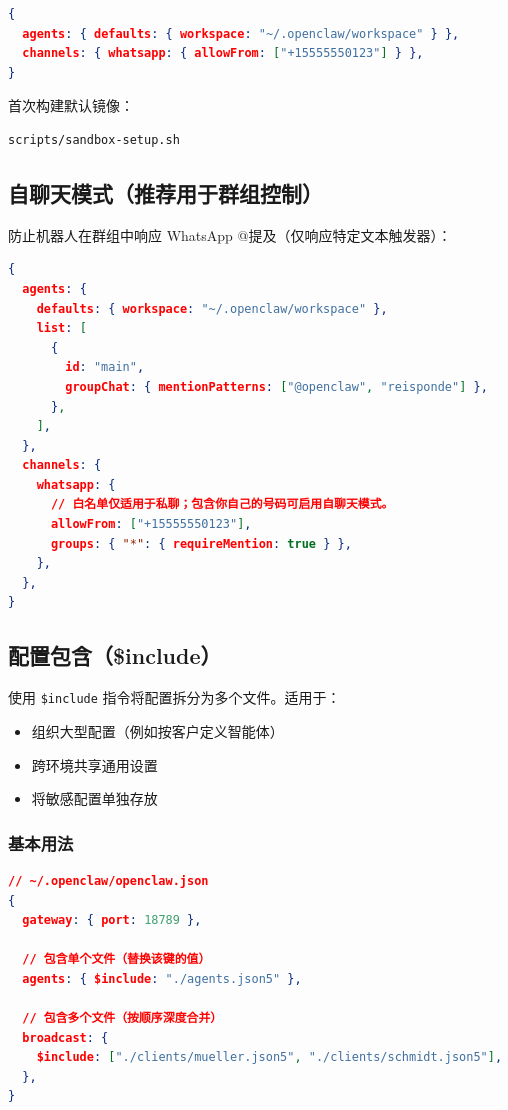 \begin{lstlisting}[language=json]
{
  agents: { defaults: { workspace: "~/.openclaw/workspace" } },
  channels: { whatsapp: { allowFrom: ["+15555550123"] } },
}
\end{lstlisting}


首次构建默认镜像：

\begin{lstlisting}[language=bash]
scripts/sandbox-setup.sh
\end{lstlisting}


\subsection{自聊天模式（推荐用于群组控制）}


防止机器人在群组中响应 WhatsApp @提及（仅响应特定文本触发器）：

\begin{lstlisting}[language=json]
{
  agents: {
    defaults: { workspace: "~/.openclaw/workspace" },
    list: [
      {
        id: "main",
        groupChat: { mentionPatterns: ["@openclaw", "reisponde"] },
      },
    ],
  },
  channels: {
    whatsapp: {
      // 白名单仅适用于私聊；包含你自己的号码可启用自聊天模式。
      allowFrom: ["+15555550123"],
      groups: { "*": { requireMention: true } },
    },
  },
}
\end{lstlisting}


\subsection{配置包含（\$include）}


使用 \texttt{\$include} 指令将配置拆分为多个文件。适用于：

\begin{itemize}
  \item 组织大型配置（例如按客户定义智能体）
  \item 跨环境共享通用设置
  \item 将敏感配置单独存放
\end{itemize}


\subsubsection{基本用法}


\begin{lstlisting}[language=json]
// ~/.openclaw/openclaw.json
{
  gateway: { port: 18789 },

  // 包含单个文件（替换该键的值）
  agents: { $include: "./agents.json5" },

  // 包含多个文件（按顺序深度合并）
  broadcast: {
    $include: ["./clients/mueller.json5", "./clients/schmidt.json5"],
  },
}
\end{lstlisting}


